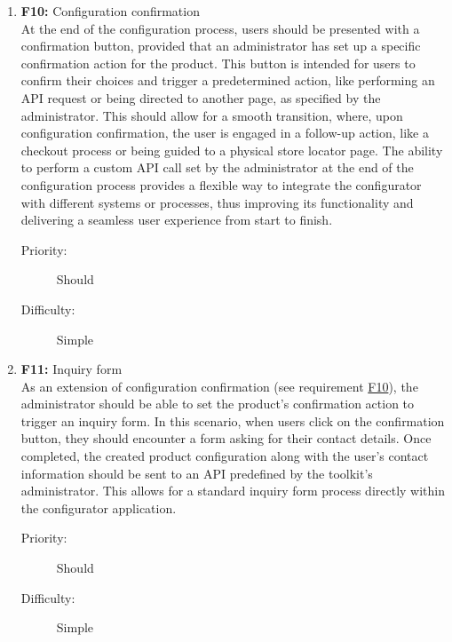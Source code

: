 \begin{enumerate}
\item \textbf{F10:} \label{itm:F10} Configuration confirmation
\vspace{2pt}
\\At the end of the configuration process, users should be presented with a confirmation button, provided that an administrator has set up a specific confirmation action for the product. This button is intended for users to confirm their choices and trigger a predetermined action, like performing an API request or being directed to another page, as specified by the administrator. This should allow for a smooth transition, where, upon configuration confirmation, the user is engaged in a follow-up action, like a checkout process or being guided to a physical store locator page. The ability to perform a custom API call set by the administrator at the end of the configuration process provides a flexible way to integrate the configurator with different systems or processes, thus improving its functionality and delivering a seamless user experience from start to finish.
\begin{description}
    \item[Priority:] Should
    \item[Difficulty:] Simple
\end{description}
\vspace{4pt}

\item \textbf{F11:} Inquiry form
\vspace{2pt}
\\As an extension of configuration confirmation (see requirement \hyperref[itm:F10]{F10}), the administrator should be able to set the product's confirmation action to trigger an inquiry form. In this scenario, when users click on the confirmation button, they should encounter a form asking for their contact details. Once completed, the created product configuration along with the user's contact information should be sent to an API predefined by the toolkit's administrator. This allows for a standard inquiry form process directly within the configurator application.
\begin{description}
    \item[Priority:] Should
    \item[Difficulty:] Simple
\end{description}
\vspace{4pt}


\end{enumerate}
